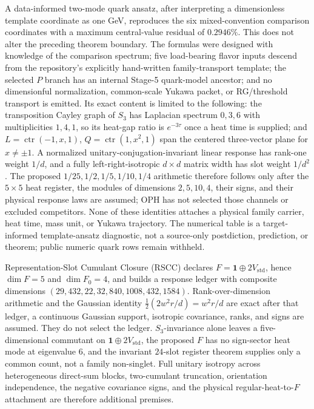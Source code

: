 \documentclass[11pt]{article}
\begin{document}
A data-informed two-mode quark ansatz, after interpreting a
dimensionless template coordinate as one GeV, reproduces the six mixed-convention comparison
coordinates with a maximum central-value residual of \(0.2946\%\).  This does not alter the
preceding theorem boundary.  The formulas were designed with knowledge of the comparison
spectrum; five load-bearing flavor inputs descend from the repository's explicitly hand-written
family-transport template; the selected \(P\) branch has an internal Stage-5 quark-model ancestor;
and no dimensionful normalization, common-scale Yukawa packet, or RG/threshold transport is
emitted. Its exact content is limited to the following: the transposition Cayley graph of
\(S_3\) has Laplacian spectrum \(0,3,6\) with multiplicities \(1,4,1\), so its heat-gap ratio is
\(e^{-3\tau}\) once a heat time is supplied; and
\(L=\operatorname{ctr}(-1,x,1)\), \(Q=\operatorname{ctr}(1,x^2,1)\) span the centered
three-vector plane for \(x\ne\pm1\).  A normalized unitary-conjugation-invariant linear response
has rank-one weight \(1/d\), and a fully left-right-isotropic \(d\times d\) matrix width has slot
weight \(1/d^2\).  The proposed \(1/25,1/2,1/5,1/10,1/4\) arithmetic therefore follows only after
the \(5\times5\) heat register, the modules of dimensions \(2,5,10,4\), their signs, and their
physical response laws are assumed; OPH has not selected those channels or excluded competitors.
None of these identities attaches a physical family carrier, heat time, mass unit, or Yukawa
trajectory. The numerical table is a target-informed template-ansatz diagnostic,
not a source-only postdiction, prediction,
or theorem; public numeric quark rows remain withheld.

Representation-Slot Cumulant Closure (RSCC) declares
\(F=\mathbf 1\oplus2V_{\mathrm{std}}\), hence \(\dim F=5\) and
\(\dim F_0=4\), and builds a response ledger with composite dimensions
\((29,\allowbreak 432,\allowbreak 22,\allowbreak 32,\allowbreak 840,\allowbreak 1008,\allowbreak 432,\allowbreak 1584)\).  Rank-over-dimension arithmetic and the
Gaussian identity
\(\frac12(2w^2r/d)=w^2r/d\) are exact after that ledger, a continuous Gaussian
support, isotropic covariance, ranks, and signs are assumed.  They do not select the ledger.
\(S_3\)-invariance alone leaves a five-dimensional commutant on
\(\mathbf 1\oplus2V_{\mathrm{std}}\), the proposed \(F\) has no sign-sector heat mode at
eigenvalue \(6\), and the invariant \(24\)-slot register theorem supplies only a common
count, not a family non-singlet.  Full unitary isotropy across heterogeneous direct-sum blocks,
two-cumulant truncation, orientation independence, the negative covariance signs, and the physical
regular-heat-to-\(F\) attachment are therefore additional premises.
\end{document}
